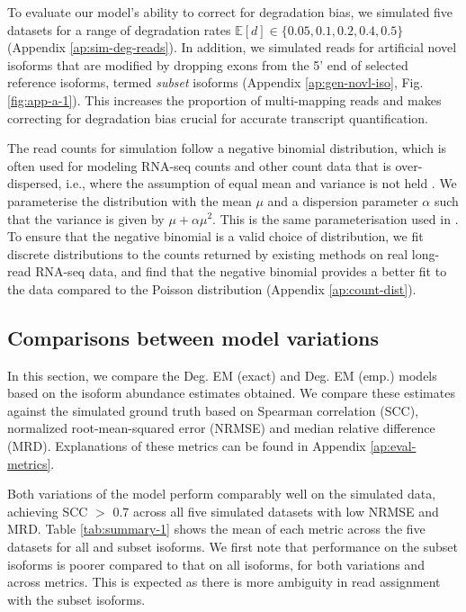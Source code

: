 To evaluate our model's ability to correct for degradation bias, we simulated five datasets for a range of degradation rates $\mathbb{E}[d]\in\{0.05,0.1,0.2,0.4,0.5\}$ (Appendix \ref{ap:sim-deg-reads}). In addition, we simulated reads for artificial novel isoforms that are modified by dropping exons from the 5' end of selected reference isoforms, termed \textit{subset} isoforms (Appendix \ref{ap:gen-novl-iso}, Fig. \ref{fig:app-a-1}). This increases the proportion of multi-mapping reads and makes correcting for degradation bias crucial for accurate transcript quantification. 

The read counts for simulation follow a negative binomial distribution, which is often used for modeling RNA-seq counts and other count data that is over-dispersed, i.e., where the assumption of equal mean and variance is not held \cite{Cameron2013, Anders2010, Robinson2010}. We parameterise the distribution with the mean $\mu$ and a dispersion parameter $\alpha$ such that the variance is given by $\mu+\alpha\mu^2$. This is the same parameterisation used in \cite{Robinson2010}. To ensure that the negative binomial is a valid choice of distribution, we fit discrete distributions to the counts returned by existing methods on real long-read RNA-seq data, and find that the negative binomial provides a better fit to the data compared to the Poisson distribution (Appendix \ref{ap:count-dist}).   

\subsection{Comparisons between model variations}

In this section, we compare the Deg. EM (exact) and Deg. EM (emp.) models based on the isoform abundance estimates obtained. We compare these estimates against the simulated ground truth based on Spearman correlation (SCC), normalized root-mean-squared error (NRMSE) and median relative difference (MRD). Explanations of these metrics can be found in Appendix \ref{ap:eval-metrics}.  

Both variations of the model perform comparably well on the simulated data, achieving SCC $>$ 0.7 across all five simulated datasets with low NRMSE and MRD. Table \ref{tab:summary-1} shows the mean of each metric across the five datasets for all and subset isoforms. We first note that performance on the subset isoforms is poorer compared to that on all isoforms, for both variations and across metrics. This is expected as there is more ambiguity in read assignment with the subset isoforms. 

